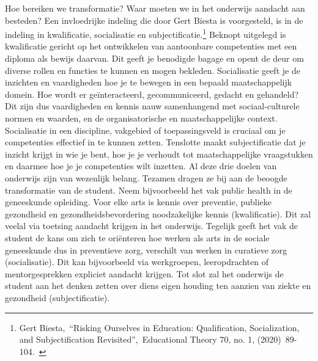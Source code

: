 \documentclass[empirical, authordate, ]{new-jote-article}
\begin{document}
	Hoe bereiken we transformatie? Waar moeten we in het onderwijs aandacht aan besteden? Een invloedrijke indeling die door Gert Biesta is voorgesteld, is in de indeling in kwalificatie, socialisatie en subjectificatie.\footnote{Gert Biesta, “Risking Ourselves in Education: Qualification, Socialization, and Subjectification Revisited”, Educational Theory 70, no. 1, (2020) 89-104. } Beknopt uitgelegd is kwalificatie gericht op het ontwikkelen van aantoonbare competenties met een diploma als bewijs daarvan. Dit geeft je benodigde bagage en opent de deur om diverse rollen en functies te kunnen en mogen bekleden. Socialisatie geeft je de inzichten en vaardigheden hoe je te bewegen in een bepaald maatschappelijk domein. Hoe wordt er geïnteracteerd, gecommuniceerd, gedacht en gehandeld? Dit zijn dus vaardigheden en kennis nauw samenhangend met sociaal-culturele normen en waarden, en de organisatorische en maatschappelijke context. Socialisatie in een discipline, vakgebied of toepassingsveld is cruciaal om je competenties effectief in te kunnen zetten. Tenslotte maakt subjectificatie dat je inzicht krijgt in wie je bent, hoe je je verhoudt tot maatschappelijke vraagstukken en daarmee hoe je je competenties wilt inzetten. Al deze drie doelen van onderwijs zijn van wezenlijk belang. Tezamen dragen ze bij aan de beoogde transformatie van de student. Neem bijvoorbeeld het vak public health in de geneeskunde opleiding. Voor elke arts is kennis over preventie, publieke gezondheid en gezondheidsbevordering noodzakelijke kennis (kwalificatie). Dit zal veelal via toetsing aandacht krijgen in het onderwijs. Tegelijk geeft het vak de student de kans om zich te oriënteren hoe werken als arts in de sociale geneeskunde dus in preventieve zorg, verschilt van werken in curatieve zorg (socialisatie). Dit kan bijvoorbeeld via werkgroepen, leeropdrachten of mentorgesprekken expliciet aandacht krijgen. Tot slot zal het onderwijs de student aan het denken zetten over diens eigen houding ten aanzien van ziekte en gezondheid (subjectificatie).
\end{document}
